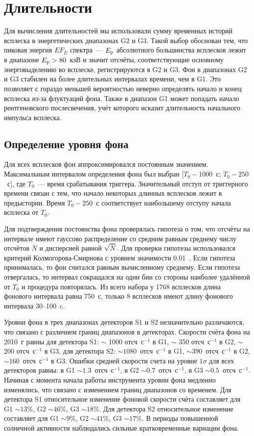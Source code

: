 \section{Длительности}\label{sec:Durations}
Для вычисления длительностей мы использовали сумму временных историй всплеска 
в энергетических диапазонах G2 и G3. Такой выбор обоснован тем, что  пиковая 
энергия $E F_{E}$ спектра~--- $E_{{\mathrm{p}}}$ абсолютного большинства всплесков лежит в 
диапазоне $E_{{\mathrm{p}}}>80$~кэВ и значит отсчёты, соответствующие  основному энерговыделению 
во всплеске, регистрируются в G2 и G3. Фон в диапазонах G2 и G3 стабилен на более 
длительных интервалах времени, чем в G1. Это позволяет с гораздо меньшей вероятностью 
неверно определять начало и конец всплеска из-за флуктуаций фона. Также в диапазон G1 
может попадать начало рентгеновского послесвечения, учёт которого исказит 
длительность начального импульса всплеска.

\subsection{Определение уровня фона}
Для всех всплесков фон аппроксимировался постоянным значением. Максимальным 
интервалом определения фона был выбран [$T_0 - 1000$~с; $T_0 - 250$~с], 
где $T_0$~--- время срабатывания триггера. Значительный отступ от триггерного 
времени связан с тем, что начало некоторых длинных всплесков лежит в предыстории. 
Время $T_0-250$~с соответствует наибольшему отступу начала всплеска от $T_0$.

Для подтверждения постоянства фона проверялась гипотеза о том, что отсчёты на 
интервале имеют гауссово распределение со средним равным среднему числу отсчётов 
$\overline{N}$ и дисперсией равной $\sqrt{\overline{N}}$. Для проверки гипотезы 
использовался критерий Колмогорова-Смирнова с уровнем значимости 0.01~\citep{Press_1992NumRec}. 
Если гипотеза принималась, то фон считался равным вычисленному среднему. 
Если гипотеза отвергалась, то интервал сокращался на одни бин со стороны наиболее 
удалённой от $T_0$ и процедура повторялась. Из всего набора у 1768 всплесков длина 
фонового интервала равна 750~с, только 8 всплесков имеют длину фонового интервала 30--100~c.

Уровни фона в трех диапазонах детекторов S1 и S2 незначительно различаются, что 
связано с различием границ диапазонов в детекторах. Скорости счёта фона на 2010~г 
равны для детектора S1: $\sim$ 1000 отсч~с$^{-1}$ в G1, $\sim$ 350 отсч~с$^{-1}$ в G2, 
$\sim$ 200 отсч~с$^{-1}$ в G3, для детектора S2: $\sim 1080$~отсч~с$^{-1}$ в G1, 
$\sim 390$~отсч~с$^{-1}$ в G2, $\sim160$~отсч~с$^{-1}$ в G3. Ошибки средней 
скорости счета на уровне $1\sigma$ для всех детекторов равны: в G1 
$\sim 1.3$~отсч~с$^{-1}$, в G2 $\sim 0.7$~отсч~с$^{-1}$, в G3 $\sim 0.5$~отсч~с$^{-1}$. 
Начиная с момента начала работы инструмента уровни фона медленно изменялись, 
что связано с изменением границ диапазонов со временем. Для детектора S1 относительное 
изменение фоновой скорости счёта составляет для G1 $\sim 13$\%, G2 $\sim 46$\%, 
G3 $\sim 18$\%. Для детектора S2 относительное изменение составляет для G1 $\sim 9$\%, 
G2 $\sim 41$\%, G3 $\sim 17$\%. В периоды повышенной солнечной активности наблюдались 
сильные кратковременные вариации фона. 


